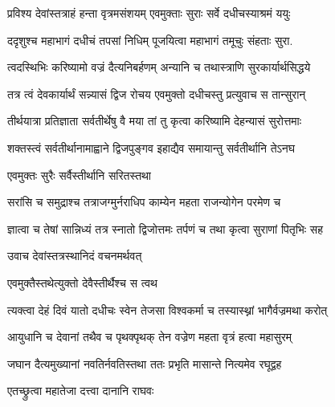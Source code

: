 \twolineshloka
{प्रविश्य देवांस्तत्राहं हन्ता वृत्रमसंशयम्}
{एवमुक्ताः सुराः सर्वे दधीचस्याश्रमं ययुः}%

\twolineshloka
{ददृशुश्च महाभागं दधीचं तपसां निधिम्}
{पूजयित्वा महाभागं तमूचुः संहताः सुरा.}%

\twolineshloka
{त्वदस्थिभिः करिष्यामो वज्रं दैत्यनिबर्हणम्}
{अन्यानि च तथास्त्राणि सुरकार्यार्थसिद्धये}%

\twolineshloka
{तत्र त्वं देवकार्यार्थं सन्न्यासं द्विज रोचय}
{एवमुक्तो दधीचस्तु प्रत्युवाच स तान्सुरान्}%

\twolineshloka
{तीर्थयात्रा प्रतिज्ञाता सर्वतीर्थेषु वै मया}
{तां तु कृत्वा करिष्यामि देहन्यासं सुरोत्तमाः}%


\twolineshloka
{शक्तस्त्वं सर्वतीर्थानामाह्वाने द्विजपुङ्गव}
{इहाद्यैव समायान्तु सर्वतीर्थानि तेऽनघ}%


\onelineshloka
{एवमुक्तः सुरैः सर्वैस्तीर्थानि सरितस्तथा}%

\twolineshloka
{सरांसि च समुद्राश्च तत्राजग्मुर्नराधिप}
{काम्येन महता राजन्योगेन परमेण च}%

\twolineshloka
{ज्ञात्वा च तेषां सान्निध्यं तत्र स्नातो द्विजोत्तमः}
{तर्पणं च तथा कृत्वा सुराणां पितृभिः सह}%

\onelineshloka
{उवाच देवांस्तत्रस्थानिदं वचनमर्थवत्}



\onelineshloka
{एवमुक्तैस्तथेत्युक्तो देवैस्तीर्थैश्च स त्वथ}%

\twolineshloka
{त्यक्त्वा देहं दिवं यातो दधीचः स्वेन तेजसा}
{विश्वकर्मा च तस्यास्थ्नां भागैर्वज्रमथा करोत्}%

\twolineshloka
{आयुधानि च देवानां तथैव च पृथक्पृथक्}
{तेन वज्रेण महता वृत्रं हत्वा महासुरम्}%

\twolineshloka
{जघान दैत्यमुख्यानां नवतिर्नवतिस्तथा}
{ततः प्रभृति मासान्ते नित्यमेव रघूद्वह}%


\onelineshloka
{एतच्छ्रुत्वा महातेजा दत्त्वा दानानि राघवः}%

